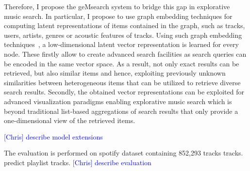 \documentclass[sigconf]{acmart}
\newcommand{\ce}[1]{\textcolor{blue}{[Chris] #1}}
\newcommand{\ce}[1]{}
\begin{document}
Therefore, I propose the geMsearch system to bridge this gap in explorative music search. In particular, I propose to use graph embedding techniques for computing latent representations of items contained in the graph, such as tracks, users, artists, genres or acoustic features of tracks. Using such graph embedding techniques~\cite{yan2007graph}, a low-dimensional latent vector representation is learned for every node. These firstly allow to create advanced search facilities as search queries can be encoded in the same vector space. As a result, not only exact results can be retrieved, but also similar items and hence, exploiting previously unknown similarities between heterogeneous items that can be utilized to retrieve diverse search results. Secondly, the obtained vector representations can be exploited for advanced visualization paradigms enabling explorative music search which is beyond traditional list-based aggregations of search results that only provide a one-dimensional view of the retrieved items. 



\ce{describe model extensions}


The evaluation is performed on spotify dataset containing 852,293 tracks tracks. predict playlist tracks.
\ce{describe evaluation}

\end{document}
